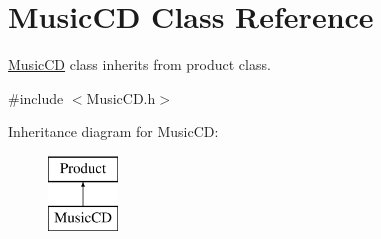 \hypertarget{classMusicCD}{}\section{Music\+CD Class Reference}
\label{classMusicCD}


\hyperlink{classMusicCD}{Music\+CD} class inherits from product class.  




{\ttfamily \#include $<$Music\+C\+D.\+h$>$}

Inheritance diagram for Music\+CD\+:\begin{figure}[H]
\begin{center}
\leavevmode
\includegraphics[height=2.000000cm]{classMusicCD}
\end{center}
\end{figure}
